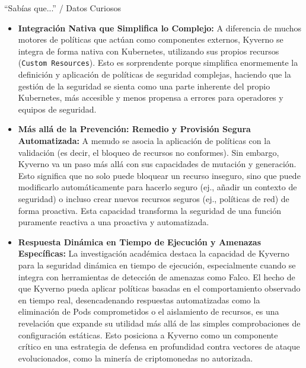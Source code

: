\documentclass[aspectratio=169]{beamer}
\begin{document}
\begin{frame}{``Sabías que...'' / Datos Curiosos}


\begin{itemize}
  \item \textbf{Integración Nativa que Simplifica lo Complejo:} A diferencia de muchos motores de políticas que actúan como componentes externos, Kyverno se integra de forma nativa con Kubernetes, utilizando sus propios recursos (\texttt{Custom Resources}). Esto es sorprendente porque simplifica enormemente la definición y aplicación de políticas de seguridad complejas, haciendo que la gestión de la seguridad se sienta como una parte inherente del propio Kubernetes, más accesible y menos propensa a errores para operadores y equipos de seguridad.
  \item \textbf{Más allá de la Prevención: Remedio y Provisión Segura Automatizada:} A menudo se asocia la aplicación de políticas con la validación (es decir, el bloqueo de recursos no conformes). Sin embargo, Kyverno va un paso más allá con sus capacidades de mutación y generación. Esto significa que no solo puede bloquear un recurso inseguro, sino que puede modificarlo automáticamente para hacerlo seguro (ej., añadir un contexto de seguridad) o incluso crear nuevos recursos seguros (ej., políticas de red) de forma proactiva. Esta capacidad transforma la seguridad de una función puramente reactiva a una proactiva y automatizada.
  \item \textbf{Respuesta Dinámica en Tiempo de Ejecución y Amenazas Específicas:} La investigación académica destaca la capacidad de Kyverno para la seguridad dinámica en tiempo de ejecución, especialmente cuando se integra con herramientas de detección de amenazas como Falco. El hecho de que Kyverno pueda aplicar políticas basadas en el comportamiento observado en tiempo real, desencadenando respuestas automatizadas como la eliminación de Pods comprometidos o el aislamiento de recursos, es una revelación que expande su utilidad más allá de las simples comprobaciones de configuración estáticas. Esto posiciona a Kyverno como un componente crítico en una estrategia de defensa en profundidad contra vectores de ataque evolucionados, como la minería de criptomonedas no autorizada.
\end{itemize}
\end{frame}
\end{document}

